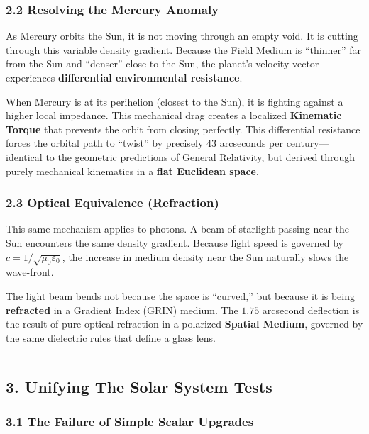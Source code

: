 \documentclass[twocolumn]{article}
\begin{document}
\subsubsection{2.2 Resolving the Mercury
Anomaly}\label{resolving-the-mercury-anomaly}

As Mercury orbits the Sun, it is not moving through an empty void. It is
cutting through this variable density gradient. Because the Field Medium
is ``thinner'' far from the Sun and ``denser'' close to the Sun, the
planet's velocity vector experiences \textbf{differential environmental
resistance}.

When Mercury is at its perihelion (closest to the Sun), it is fighting
against a higher local impedance. This mechanical drag creates a
localized \textbf{Kinematic Torque} that prevents the orbit from closing
perfectly. This differential resistance forces the orbital path to
``twist'' by precisely 43 arcseconds per century---identical to the
geometric predictions of General Relativity, but derived through purely
mechanical kinematics in a \textbf{flat Euclidean space}.

\subsubsection{2.3 Optical Equivalence
(Refraction)}\label{optical-equivalence-refraction}

This same mechanism applies to photons. A beam of starlight passing near
the Sun encounters the same density gradient. Because light speed is
governed by \(c = 1/\sqrt{\mu_0 \varepsilon_0}\), the increase in medium
density near the Sun naturally slows the wave-front.

The light beam bends not because the space is ``curved,'' but because it
is being \textbf{refracted} in a Gradient Index (GRIN) medium. The
\(1.75\) arcsecond deflection is the result of pure optical refraction
in a polarized \textbf{Spatial Medium}, governed by the same dielectric
rules that define a glass lens.

\begin{center}\rule{0.5\linewidth}{0.5pt}\end{center}

\subsection{3. Unifying The Solar System
Tests}\label{unifying-the-solar-system-tests}

\subsubsection{3.1 The Failure of Simple Scalar
Upgrades}\label{the-failure-of-simple-scalar-upgrades}
\end{document}
